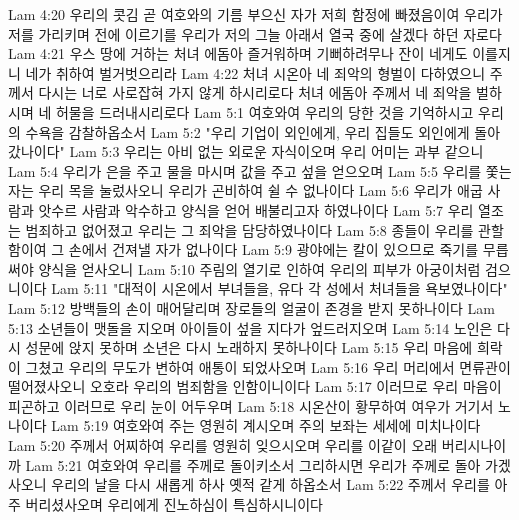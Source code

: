 Lam 4:20  우리의 콧김 곧 여호와의 기름 부으신 자가 저희 함정에 빠졌음이여 우리가 저를 가리키며 전에 이르기를 우리가 저의 그늘 아래서 열국 중에 살겠다 하던 자로다
Lam 4:21  우스 땅에 거하는 처녀 에돔아 즐거워하며 기뻐하려무나 잔이 네게도 이를지니 네가 취하여 벌거벗으리라
Lam 4:22  처녀 시온아 네 죄악의 형벌이 다하였으니 주께서 다시는 너로 사로잡혀 가지 않게 하시리로다 처녀 에돔아 주께서 네 죄악을 벌하시며 네 허물을 드러내시리로다
Lam 5:1  여호와여 우리의 당한 것을 기억하시고 우리의 수욕을 감찰하옵소서
Lam 5:2  "우리 기업이 외인에게, 우리 집들도 외인에게 돌아갔나이다"
Lam 5:3  우리는 아비 없는 외로운 자식이오며 우리 어미는 과부 같으니
Lam 5:4  우리가 은을 주고 물을 마시며 값을 주고 섶을 얻으오며
Lam 5:5  우리를 쫓는 자는 우리 목을 눌렀사오니 우리가 곤비하여 쉴 수 없나이다
Lam 5:6  우리가 애굽 사람과 앗수르 사람과 악수하고 양식을 얻어 배불리고자 하였나이다
Lam 5:7  우리 열조는 범죄하고 없어졌고 우리는 그 죄악을 담당하였나이다
Lam 5:8  종들이 우리를 관할함이여 그 손에서 건져낼 자가 없나이다
Lam 5:9  광야에는 칼이 있으므로 죽기를 무릅써야 양식을 얻사오니
Lam 5:10  주림의 열기로 인하여 우리의 피부가 아궁이처럼 검으니이다
Lam 5:11  "대적이 시온에서 부녀들을, 유다 각 성에서 처녀들을 욕보였나이다"
Lam 5:12  방백들의 손이 매어달리며 장로들의 얼굴이 존경을 받지 못하나이다
Lam 5:13  소년들이 맷돌을 지오며 아이들이 섶을 지다가 엎드러지오며
Lam 5:14  노인은 다시 성문에 앉지 못하며 소년은 다시 노래하지 못하나이다
Lam 5:15  우리 마음에 희락이 그쳤고 우리의 무도가 변하여 애통이 되었사오며
Lam 5:16  우리 머리에서 면류관이 떨어졌사오니 오호라 우리의 범죄함을 인함이니이다
Lam 5:17  이러므로 우리 마음이 피곤하고 이러므로 우리 눈이 어두우며
Lam 5:18  시온산이 황무하여 여우가 거기서 노나이다
Lam 5:19  여호와여 주는 영원히 계시오며 주의 보좌는 세세에 미치나이다
Lam 5:20  주께서 어찌하여 우리를 영원히 잊으시오며 우리를 이같이 오래 버리시나이까
Lam 5:21  여호와여 우리를 주께로 돌이키소서 그리하시면 우리가 주께로 돌아 가겠사오니 우리의 날을 다시 새롭게 하사 옛적 같게 하옵소서
Lam 5:22  주께서 우리를 아주 버리셨사오며 우리에게 진노하심이 특심하시니이다


